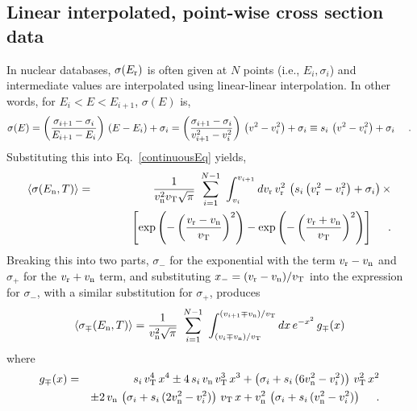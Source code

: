 \documentclass[11pt,twoside]{article}
\begin{document}
\subsection{Linear interpolated, point-wise cross section data} \label{lin_pointxsec}
In nuclear databases, $\sigma(E_{\rm r})$ is often given at $N$ points (i.e., $E_i, \sigma_i$) and intermediate values are
interpolated using linear-linear interpolation. In other words, for $E_i < E < E_{i+1}$, $\sigma(E)$ is,
\begin{equation}
	\sigma(E) = \left( { \sigma_{i+1} - \sigma_i \over E_{i+1} - E_i } \right) \, \left( E - E_i \right) + \sigma_i 
		= \left( { \sigma_{i+1} - \sigma_i \over v_{i+1}^2 - v_i^2 } \right) \, \left( v^2 - v_i^2 \right) + \sigma_i
		\equiv s_i \, \left( v^2 - v_i^2 \right) + \sigma_i \ \ \ \ .
\end{equation}
Substituting this into Eq.~\ref{continuousEq} yields,
\begin{eqnarray}    \label{discreteEq}
    \left<\sigma(E_{\rm n},T)\right> & = & { 1 \over v_{\rm n}^2 v_{\rm T} \sqrt{\pi} } \ \sum_{i=1}^{N-1} \ 
		\int_{v_i}^{v_{i+1}}dv_{\rm r} \, v_{\rm r}^2 \, 
        \left( s_i \left( v_{\rm r}^2 - v_i^2 \right) + \sigma_i \right) \times \nonumber \\
		& & \ \ \ \ \ \ \ \ \left[ \exp\left( -\left( { v_{\rm r} - v_{\rm n} \over v_{\rm T} } \right)^2 \right)
        - \exp\left( -\left( { v_{\rm r} + v_{\rm n} \over v_{\rm T } } \right)^2 \right) \right] \ \ \ \ .
\end{eqnarray}
Breaking this into two parts, $\sigma_-$ for the exponential with the term
$v_{\rm r} - v_{\rm n}$ and $\sigma_+$ for the $v_{\rm r} + v_{\rm n}$ term,
and substituting $x_- = ( v_{\rm r} - v_{\rm n} ) / v_{\rm T}$ into the expression for $\sigma_-$,
with a similar substitution for $\sigma_+$, produces
\begin{equation}	\label{discreteEq2}
	\left<\sigma_\mp(E_{\rm n},T)\right> = { 1 \over v_{\rm n}^2 \sqrt{\pi} } \ \sum_{i=1}^{N-1} \
	\int_{( v_i \mp v_{\rm n} ) / v_{\rm T}}^{( v_{i+1} \mp v_{\rm n} ) / v_{\rm T}} dx \, e^{-x^2} \, g_\mp(x)
\end{equation}
where
\begin{eqnarray}
    g_\mp(x) & = & s_i \, v_{\rm T}^4 \, x^4 \pm 4 \, s_i \, v_{\rm n} \, v_{\rm T}^3 \, x^3 + 
	\left( \sigma_i + s_i \, ( 6 v_{\rm n}^2 - v_i^2 ) \right) \, v_{\rm T}^2 \, x^2 \nonumber \\
	& & \pm 2 \, v_{\rm n} \, \left( \sigma_i + s_i \, ( 2 v_{\rm n}^2 - v_i^2 ) \right) \, v_{\rm T} \, x +
	v_{\rm n}^2 \, \left( \sigma_i + s_i \, ( v_{\rm n}^2 - v_i^2 ) \right) \ \ \ \ .
\end{eqnarray}
\end{document}
